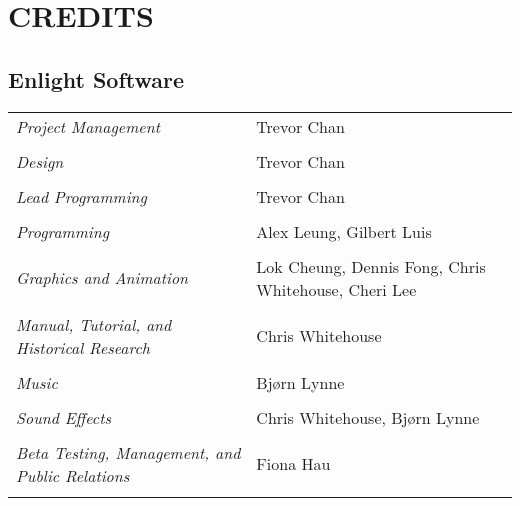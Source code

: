 
\chapter{\textsf{CREDITS}}

\section{Enlight Software}

\begin{tabular}{p{2in} p{2in}}
    \textit{Project Management} & Trevor Chan \\ \\
    \textit{Design} & Trevor Chan \\ \\
    \textit{Lead Programming} & Trevor Chan \\ \\
    \textit{Programming} & Alex Leung, Gilbert Luis \\ \\
    \textit{Graphics and Animation} & Lok Cheung, Dennis Fong, Chris Whitehouse, Cheri Lee \\ \\
    \textit{Manual, Tutorial, and Historical Research} & Chris Whitehouse \\ \\
    \textit{Music} & Bjørn Lynne \\ \\
    \textit{Sound Effects} & Chris Whitehouse, Bjørn Lynne \\ \\
    \textit{Beta Testing, Management, and Public Relations} & Fiona Hau \\ \\
\end{tabular}


